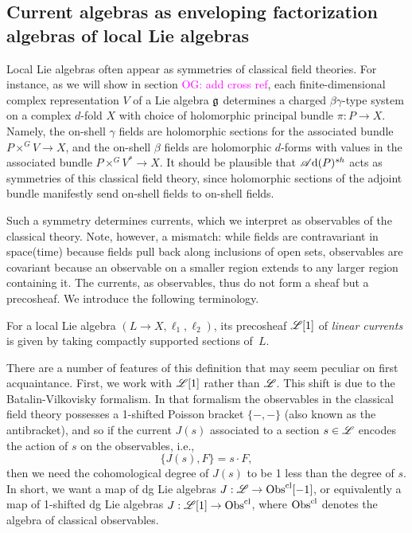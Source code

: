 \documentclass[10pt]{amsart}
\def\sAd{\sA{\rm d}}
\def\owen{\textcolor{magenta}{OG: }\textcolor{magenta}}
\begin{document}
\subsection{Current algebras as enveloping factorization algebras of local Lie algebras}

Local Lie algebras often appear as symmetries of classical field theories.
For instance, as we will show in section \owen{add cross ref}, 
each finite-dimensional complex representation $V$ of a Lie algebra $\mathfrak g$
determines a charged $\beta\gamma$-type system on a complex $d$-fold $X$ with choice of holomorphic principal bundle $\pi: P \to X$.
Namely, the on-shell $\gamma$ fields are holomorphic sections for the associated bundle $P \times^G V \to X$, 
and the on-shell $\beta$ fields are holomorphic $d$-forms with values in the associated bundle $P \times^G V^* \to X$.
It should be plausible that $\sAd(P)^{sh}$ acts as symmetries of this classical field theory,
since holomorphic sections of the adjoint bundle manifestly send on-shell fields to on-shell fields.

Such a symmetry determines currents, which we interpret as observables of the classical theory.
Note, however, a mismatch: 
while fields are contravariant in space(time) because fields pull back along inclusions of open sets, 
observables are covariant because an observable on a smaller region extends to any larger region containing it.
The currents, as observables, thus do not form a sheaf but a precosheaf.
We introduce the following terminology.

\begin{dfn}
For a local Lie algebra $(L\to X, \ell_1,\ell_2)$, its precosheaf $\mathscr L[1]$ of {\em linear currents} is given by taking compactly supported sections of~$L$.
\end{dfn}

There are a number of features of this definition that may seem peculiar on first acquaintance.
First, we work with $\mathscr L[1]$ rather than $\mathscr L$.
This shift is due to the Batalin-Vilkovisky formalism. 
In that formalism the observables in the classical field theory possesses a 1-shifted Poisson bracket $\{-,-\}$ (also known as the antibracket), and so if the current $J(s)$ associated to a section $s \in \mathscr L$ encodes the action of $s$ on the observables, i.e.,
\[
\{J(s), F\} = s \cdot F,
\]
then we need the cohomological degree of $J(s)$ to be 1 less than the degree of $s$.
In short, we want a map of dg Lie algebras $J: \mathscr L \to {\rm Obs}^{\rm cl}[-1]$,
or equivalently a map of 1-shifted dg Lie algebras $J: \mathscr L[1] \to {\rm Obs}^{\rm cl}$,
where ${\rm Obs}^{\rm cl}$ denotes the algebra of classical observables.
\end{document}
